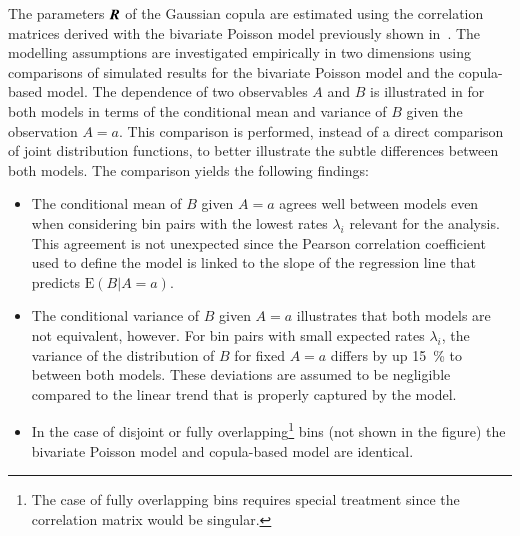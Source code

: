 The parameters $\myvec{R}$ of the Gaussian copula are estimated using
the correlation matrices derived with the bivariate Poisson model
previously shown in~. The
modelling assumptions are investigated empirically in two dimensions
using comparisons of simulated results for the bivariate Poisson model
and the copula-based model. The dependence of two observables $A$ and
$B$ is illustrated in  for both
models in terms of the conditional mean and variance of $B$ given the
observation $A = a$. This comparison is performed, instead of a direct
comparison of joint distribution functions, to better illustrate the
subtle differences between both models. The comparison yields the
following findings:
\begin{itemize}
\item The conditional mean of $B$ given $A = a$ agrees well between
  models even when considering bin pairs with the lowest rates
  $\lambda_i$ relevant for the analysis. This agreement is not
  unexpected since the Pearson correlation coefficient used to define
  the model is linked to the slope of the regression line that
  predicts $\mathrm{E}(B \vert A = a)$.

\item The conditional variance of $B$ given $A = a$ illustrates that
  both models are not equivalent, however. For bin pairs with small
  expected rates $\lambda_i$, the variance of the distribution of $B$
  for fixed $A = a$ differs by up \SI{15}{\percent} to between both
  models. These deviations are assumed to be negligible compared to
  the linear trend that is properly captured by the model.

\item In the case of disjoint or fully overlapping\footnote{The case
    of fully overlapping bins requires special treatment since the
    correlation matrix would be singular.} bins (not shown in the
  figure) the bivariate Poisson model and copula-based model are
  identical.
\end{itemize}

